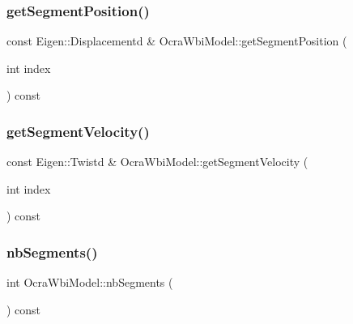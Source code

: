 \hypertarget{classocra__icub_1_1OcraWbiModel_acb6a8faee8b9f32fdea179c2103be606}{}\label{classocra__icub_1_1OcraWbiModel_acb6a8faee8b9f32fdea179c2103be606} 
\subsubsection{\texorpdfstring{get\+Segment\+Position()}{getSegmentPosition()}}
{\footnotesize\ttfamily const Eigen\+::\+Displacementd \& Ocra\+Wbi\+Model\+::get\+Segment\+Position (\begin{DoxyParamCaption}\item[{int}]{index }\end{DoxyParamCaption}) const\hspace{0.3cm}{\ttfamily [virtual]}}

\hypertarget{classocra__icub_1_1OcraWbiModel_a30e1597e69afd309c648ce7e1036f899}{}\label{classocra__icub_1_1OcraWbiModel_a30e1597e69afd309c648ce7e1036f899} 
\subsubsection{\texorpdfstring{get\+Segment\+Velocity()}{getSegmentVelocity()}}
{\footnotesize\ttfamily const Eigen\+::\+Twistd \& Ocra\+Wbi\+Model\+::get\+Segment\+Velocity (\begin{DoxyParamCaption}\item[{int}]{index }\end{DoxyParamCaption}) const\hspace{0.3cm}{\ttfamily [virtual]}}

\hypertarget{classocra__icub_1_1OcraWbiModel_a268f2b5b4dd0de558bfc9d8f9fa23db9}{}\label{classocra__icub_1_1OcraWbiModel_a268f2b5b4dd0de558bfc9d8f9fa23db9} 
\subsubsection{\texorpdfstring{nb\+Segments()}{nbSegments()}}
{\footnotesize\ttfamily int Ocra\+Wbi\+Model\+::nb\+Segments (\begin{DoxyParamCaption}{ }\end{DoxyParamCaption}) const\hspace{0.3cm}{\ttfamily [virtual]}}

